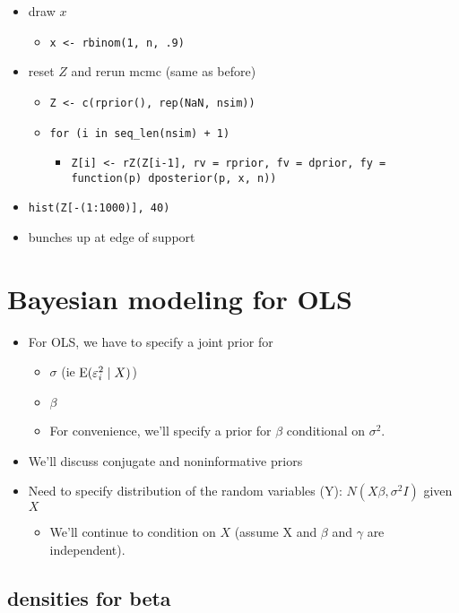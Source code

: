 \begin{itemize}
\begin{itemize}
\item draw $x$
\begin{itemize}
\item \texttt{x <- rbinom(1, n, .9)}
\end{itemize}
\item reset $Z$ and rerun mcmc (same as before)
\begin{itemize}
\item \texttt{Z <- c(rprior(), rep(NaN, nsim))}
\item \texttt{for (i in seq\_len(nsim) + 1)}
\begin{itemize}
\item \texttt{Z[i] <- rZ(Z[i-1], rv = rprior, fv = dprior, fy = function(p) dposterior(p, x, n))}
\end{itemize}
\end{itemize}
\item \texttt{hist(Z[-(1:1000)], 40)}
\item bunches up at edge of support
\end{itemize}
\end{itemize}

\section{Bayesian modeling for OLS}

\begin{itemize}[leftmargin=0pt]
\item For OLS, we have to specify a joint prior for
\begin{itemize}
\item $\sigma$ (ie $\operatorname{E}(\varepsilon^2_i \mid X)$)
\item $\beta$
\item For convenience, we'll specify a prior for $\beta$ conditional on $\sigma^2$.
\end{itemize}
\item We'll discuss conjugate and noninformative priors
\item Need to specify distribution of the random variables (Y): $N(X\beta,
  \sigma^2 I)$ given $X$
\begin{itemize}
\item We'll continue to condition on $X$ (assume X and $\beta$ and $\gamma$ are
  independent).
\end{itemize}
\end{itemize}

\subsection{densities for beta}

